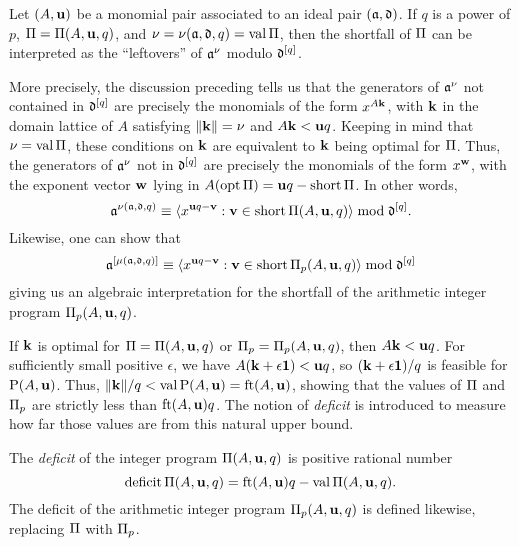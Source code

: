 \documentclass{amsart}
\begin{document}
\begin{remark}
\label{shortfall motivation: R}
Let $(A,\mathbf{u})$ be a monomial pair associated to an ideal pair $(\mathfrak{a},\mathfrak{d})$.
If $q$ is a power of $p$, $\Pi = \Pi(A,\mathbf{u},q)$, and $\nu = \nu(\mathfrak{a},\mathfrak{d},q) = \operatorname{val} \Pi$, then the shortfall of $\Pi$ can be interpreted as the ``leftovers'' of $\mathfrak{a}^\nu$ modulo $\mathfrak{d}^{[q]}$.

More precisely, the discussion preceding  tells us that the generators of $\mathfrak{a}^{\nu}$ not contained in $\mathfrak{d}^{[q]}$ are precisely the monomials of the form $x^{A \mathbf{k}}$, with $\mathbf{k}$ in the domain lattice of $A$ satisfying $\| \mathbf{k} \| = \nu$ and $A\mathbf{k}<\mathbf{u}q$.
Keeping in mind that $\nu= \operatorname{val} \Pi$, these conditions on $\mathbf{k}$ are equivalent to $\mathbf{k}$ being optimal for $\Pi$.
Thus, the generators of $\mathfrak{a}^{\nu}$ not in $\mathfrak{d}^{[q]}$ are precisely the monomials of the form $x^{\mathbf{w}}$, with the exponent vector $\mathbf{w}$ lying in $A(\operatorname{opt} \Pi) = \mathbf{u}q - \operatorname{short} \Pi$.
In other words,
\begin{equation}
\label{algebraic shortfall PI general: e}
 \mathfrak{a}^{\nu(\mathfrak{a}, \mathfrak{d}, q)} \equiv \langle x^{\mathbf{u}q-\mathbf{v}}: \mathbf{v} \in \operatorname{short} \Pi(A,\mathbf{u},q) \rangle \bmod \mathfrak{d}^{[q]}.
 \end{equation}
Likewise, one can show that
\begin{equation}
\label{algebraic shortfall PI_p general: e}
\mathfrak{a}^{[\mu(\mathfrak{a}, \mathfrak{d}, q)]} \equiv \langle x^{\mathbf{u}q-\mathbf{v}}: \mathbf{v} \in \operatorname{short} \Pi_p(A,\mathbf{u},q) \rangle \bmod \mathfrak{d}^{[q]}
\end{equation}
giving us an algebraic interpretation for the shortfall of the arithmetic integer program $\Pi_p(A,\mathbf{u},q)$.
\end{remark}

If $\mathbf{k}$ is optimal for $\Pi = \Pi(A,\mathbf{u},q)$ or $\Pi_p = \Pi_p(A,\mathbf{u},q)$, then $A\mathbf{k} < \mathbf{u}q$.
For sufficiently small positive $\epsilon$, we have $A(\mathbf{k}+\epsilon\mathbf{1}) < \mathbf{u}q$, so $(\mathbf{k}+\epsilon \mathbf{1})/q$ is feasible for $\mathrm{P}(A,\mathbf{u})$.
Thus, $\| \mathbf{k} \|/q < \operatorname{val} \mathrm{P}(A,\mathbf{u}) = \operatorname{ft}(A, \mathbf{u})$, showing that the values of $\Pi$ and $\Pi_p$ are strictly less than $\operatorname{ft}(A, \mathbf{u})q$.
The notion of \emph{deficit} is introduced to measure how far those values are from this natural upper bound.

\begin{definition}
   The \emph{deficit} of the integer program $\Pi(A, \mathbf{u}, q)$ is positive rational number
   \[ \operatorname{deficit} \Pi(A, \mathbf{u}, q) = \operatorname{ft}(A, \mathbf{u})q - \operatorname{val} \Pi(A, \mathbf{u}, q).\]
   The deficit of the arithmetic integer program $\Pi_p(A, \mathbf{u}, q)$ is defined likewise, replacing $\Pi$ with $\Pi_p$.
\end{definition}
\end{document}
